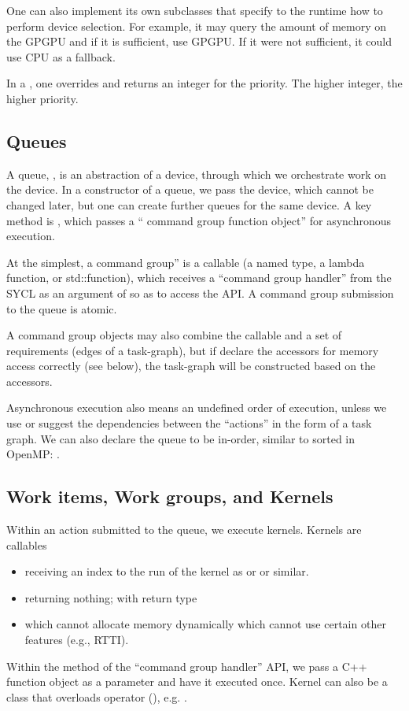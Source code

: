 One can also implement its own subclasses that specify to the runtime how to perform device selection.
For example, it may query the amount of memory on the GPGPU and if it is sufficient, 
use GPGPU. If it were not sufficient, it could use CPU as a fallback. 

In a , one overrides 
and returns an integer for the priority. The higher integer, the higher priority. 

\subsection{Queues}

A queue, , is an abstraction of a device,
through which we orchestrate work on the device.
In a constructor of a queue, we pass the device, which cannot be changed later,
but one can create further queues for the same device.
A key method is ,
which passes a `` command group function object'' for asynchronous execution. 

At the simplest, a command group'' is a callable (a named type, a lambda function, or std::function), which receives a ``command group handler'' from the SYCL as an argument of  so as to access the API. 
A command group submission to the queue is atomic.  

A command group objects may also combine the callable and a set of requirements (edges of a task-graph), but if declare the accessors for memory access correctly (see below), the task-graph will be constructed based on the accessors. 

Asynchronous execution also means an undefined order of execution, 
unless we use  or suggest the dependencies between the ``actions'' in the form of a task graph.
We can also declare the queue to be in-order, similar to sorted in OpenMP:
.


 \subsection{Work items, Work groups, and Kernels}

Within an action submitted to the queue, we execute kernels.
 Kernels are callables 
 \begin{itemize}
 \item receiving an index to the run of the kernel as  or  or similar.
 \item returning nothing; with  return type 
 \item which cannot allocate memory dynamically
 \itme which cannot use certain other features (e.g., RTTI). 
\end{itemize}
Within the  method of the ``command group handler'' API, 
we pass a C++ function object as a parameter and have it executed once. 
Kernel can also be a class that overloads operator (), e.g. .

